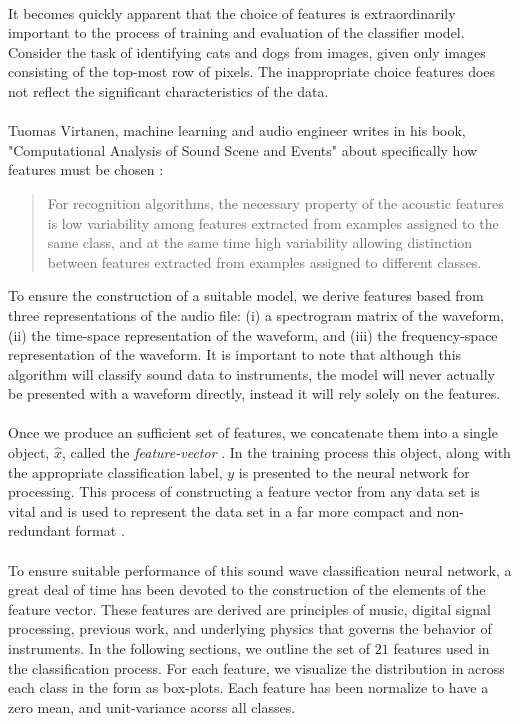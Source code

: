 \documentclass[12pt,letterpaper]{article}
\begin{document}
\paragraph*{}It becomes quickly apparent that the choice of features is extraordinarily important to the process of training and evaluation of the classifier model. Consider the task of identifying cats and dogs from images, given only images consisting of the top-most row of pixels. The inappropriate choice features does not reflect the significant characteristics of the data.

\paragraph*{}Tuomas Virtanen, machine learning and audio engineer writes in his book, "Computational Analysis of Sound Scene and Events" about specifically how features must be chosen \cite{Virtanen}:
\begin{quote}
For recognition algorithms, the necessary property of the acoustic features is low variability among features extracted from examples assigned to the same class, and at the same time high variability allowing distinction between features extracted from examples assigned to different classes.
\end{quote}
To ensure the construction of a suitable model, we derive features based from three representations of the audio file: (i) a spectrogram matrix of the waveform, (ii) the time-space representation of the waveform, and (iii) the frequency-space representation of the waveform. It is important to note that although this algorithm will classify sound data to instruments, the model will never actually be presented with a waveform directly, instead it will rely solely on the features.

\paragraph*{}Once we produce an sufficient set of features, we concatenate them into a single object, $\hat{x}$, called the \textit{feature-vector} \cite{Goodfellow}. In the training process this object, along with the appropriate classification label, $y$ is presented to the neural network for processing. This process of constructing a feature vector from any data set is vital and is used to represent the data set in a far more compact and non-redundant format \cite{Virtanen,Liu,Kahn}.

\paragraph*{}To ensure suitable performance of this sound wave classification neural network, a great deal of time has been devoted to the construction of the elements of the feature vector. These features are derived are principles of music, digital signal processing, previous work, and underlying physics that governs the behavior of instruments. In the following sections, we outline the set of $21$ features used in the classification process. For each feature, we visualize the distribution in across each class in the form as box-plots. Each feature has been normalize to have a zero mean, and unit-variance acorss all classes. 
\end{document}
